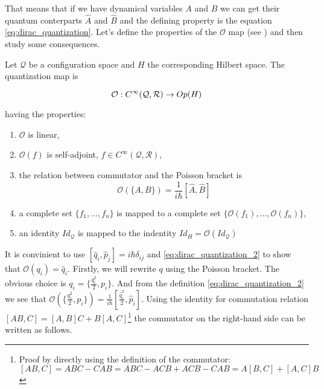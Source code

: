 That means that if we have dynamical variables $A$ and $B$ we can get their quantum conterparts $\hat{A}$ and $\hat{B}$ and the
defining property is the equation \ref{eq:dirac_quantization}. Let's define the properties of the $\mathcal{O}$ map (see \cite{floarin_jung})
and then study some consequences.

\begin{definition}
    \label{df:o_map}

    Let $\mathcal{Q}$ be a configuration space and $H$ the corresponding Hilbert space. The quantization map is

    \begin{equation}
        \mathcal{O}: C^{\infty}(\mathcal{Q}, \mathcal{R}) \to Op(H) \\
    \end{equation}
    
    having the properties:

    \begin{enumerate}
        \item $\mathcal{O}$ is linear,
        \item $\mathcal{O}(f)$ is self-adjoint, $f \in C^{\infty}(\mathcal{Q}, \mathcal{R})$,
        \item the relation between commutator and the Poisson bracket is
            \begin{equation}
                \label{eq:dirac_quantization_2}
                \mathcal{O}(\{A, B\}) = \frac{1}{i \hbar} [\hat{A}, \hat{B}]
            \end{equation}
        \item a complete set $\{f_{1}, \dots, f_{n}\}$ is mapped to a complete set $\{\mathcal{O}(f_{1}), \dots, \mathcal{O}(f_{n})\}$,
        \item an identity $Id_{\mathcal{Q}}$ is mapped to the indentity $Id_{H} = \mathcal{O}(Id_{\mathcal{Q}})$
    \end{enumerate}
\end{definition}

It is convinient to use $[\hat{q}_{i}, \hat{p}_{j}] = i \hbar \delta_{ij}$ and \ref{eq:dirac_quantization_2} to show
that $\mathcal{O}(q_{i}) = \hat{q}_{i}$. Firstly, we will rewrite $q$ using the Poisson bracket. The obvious choice is $q_{i} = \{\frac{q_{i}^{2}}{2}, p_{i}\}$.
And from the definition \ref{eq:dirac_quantization_2} we see that $\mathcal{O}(\{\frac{q_{i}^{2}}{2}, p_{i}\}) = \frac{1}{i \hbar}[\frac{\hat{q}_{i}^{2}}{2}, \hat{p}_{i}]$.
Using the identity for commutation relation $[AB, C] = [A, B]C + B[A, C]$\footnote{Proof by directly using the definition of 
the commutator: $[AB, C] = ABC - CAB = ABC - ACB + ACB - CAB = A [B, C] + [A, C] B$} the commutator on the right-hand side can
be written as follows.

